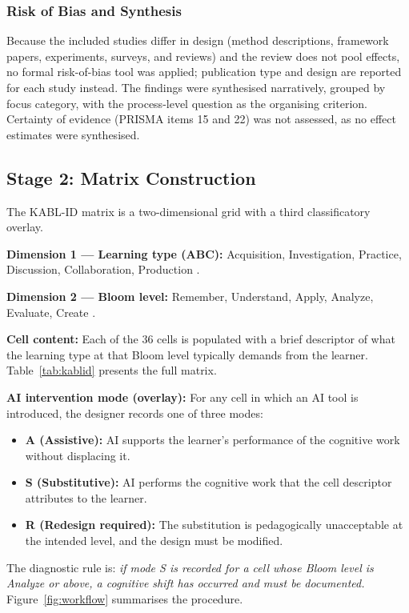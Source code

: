 \documentclass[journal,article,submit,pdftex,moreauthors]{Definitions/mdpi}
\begin{document}
\subsubsection{Risk of Bias and Synthesis}
\label{sec:synthesis}

Because the included studies differ in design (method descriptions, framework papers, experiments, surveys, and reviews) and the review does not pool effects, no formal risk-of-bias tool was applied; publication type and design are reported for each study instead. The findings were synthesised narratively, grouped by focus category, with the process-level question as the organising criterion. Certainty of evidence (PRISMA items 15 and 22) was not assessed, as no effect estimates were synthesised.

\subsection{Stage 2: Matrix Construction}
\label{sec:matrix}

The KABL-ID matrix is a two-dimensional grid with a third classificatory overlay.

\textbf{Dimension 1 --- Learning type (ABC):} Acquisition, Investigation, Practice, Discussion, Collaboration, Production \cite{abcld_6types}.

\textbf{Dimension 2 --- Bloom level:} Remember, Understand, Apply, Analyze, Evaluate, Create \cite{anderson_krathwohl_2001}.

\textbf{Cell content:} Each of the 36 cells is populated with a brief descriptor of what the learning type at that Bloom level typically demands from the learner. Table~\ref{tab:kablid} presents the full matrix.

\textbf{AI intervention mode (overlay):} For any cell in which an AI tool is introduced, the designer records one of three modes:
\begin{itemize}[leftmargin=*]
  \item \textbf{A (Assistive):} AI supports the learner's performance of the cognitive work without displacing it.
  \item \textbf{S (Substitutive):} AI performs the cognitive work that the cell descriptor attributes to the learner.
  \item \textbf{R (Redesign required):} The substitution is pedagogically unacceptable at the intended level, and the design must be modified.
\end{itemize}

The diagnostic rule is: \emph{if mode S is recorded for a cell whose Bloom level is Analyze or above, a cognitive shift has occurred and must be documented.} Figure~\ref{fig:workflow} summarises the procedure.
\end{document}
